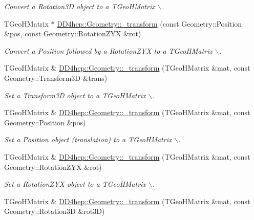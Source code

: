 \begin{DoxyCompactItemize}
\begin{DoxyCompactList}\small\item\em Convert a Rotation3D object to a TGeoHMatrix $\backslash$. \item\end{DoxyCompactList}\item 
TGeoHMatrix $\ast$ \hyperlink{group___d_d4_h_e_p___g_e_o_m_e_t_r_y_gad6f7e93a5f8c5ae037658aa594d2f83b}{DD4hep::Geometry::\_\-transform} (const Geometry::Position \&pos, const Geometry::RotationZYX \&rot)
\begin{DoxyCompactList}\small\item\em Convert a Position followed by a RotationZYX to a TGeoHMatrix $\backslash$. \item\end{DoxyCompactList}\item 
TGeoHMatrix \& \hyperlink{group___d_d4_h_e_p___g_e_o_m_e_t_r_y_gae56d3e609e5195af8ba7271391b608e5}{DD4hep::Geometry::\_\-transform} (TGeoHMatrix \&mat, const Geometry::Transform3D \&trans)
\begin{DoxyCompactList}\small\item\em Set a Transform3D object to a TGeoHMatrix $\backslash$. \item\end{DoxyCompactList}\item 
TGeoHMatrix \& \hyperlink{group___d_d4_h_e_p___g_e_o_m_e_t_r_y_ga115e4b33b3d4b31fc0c2a2de57c8a14b}{DD4hep::Geometry::\_\-transform} (TGeoHMatrix \&mat, const Geometry::Position \&pos)
\begin{DoxyCompactList}\small\item\em Set a Position object (translation) to a TGeoHMatrix $\backslash$. \item\end{DoxyCompactList}\item 
TGeoHMatrix \& \hyperlink{group___d_d4_h_e_p___g_e_o_m_e_t_r_y_gae00745e30557512fe1da42fc705d42d1}{DD4hep::Geometry::\_\-transform} (TGeoHMatrix \&mat, const Geometry::RotationZYX \&rot)
\begin{DoxyCompactList}\small\item\em Set a RotationZYX object to a TGeoHMatrix $\backslash$. \item\end{DoxyCompactList}\item 
TGeoHMatrix \& \hyperlink{group___d_d4_h_e_p___g_e_o_m_e_t_r_y_ga249607824f27e539ae7a6d93d367afc6}{DD4hep::Geometry::\_\-transform} (TGeoHMatrix \&mat, const Geometry::Rotation3D \&rot3D)

\end{DoxyCompactItemize}
